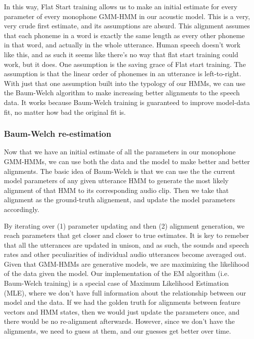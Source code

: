 \documentclass[10pt,a4paper]{article}
\begin{document}
  

In this way, Flat Start training allows us to make an initial estimate for every parameter of every monophone GMM-HMM in our acoustic model. This is a very, very crude first estimate, and its assumptions are absurd. This alignment assumes that each phoneme in a word is exactly the same length as every other phoneme in that word, and actually in the whole utterance. Human speech doesn't work like this, and as such it seems like there's no way that flat start training could work, but it does. One assumption is the saving grace of Flat start training. The assumption is that the linear order of phonemes in an utterance is left-to-right. With just that one assumption built into the typology of our HMMs, we can use the Baum-Welch algorithm to make increasing better alignments to the speech data. It works because Baum-Welch training is guaranteed to improve model-data fit, no matter how bad the original fit is.

\subsubsection*{Baum-Welch re-estimation}

Now that we have an initial estimate of all the parameters in our monophone GMM-HMMs, we can use both the data and the model to make better and better alignments. The basic idea of Baum-Welch is that we can use the the current model parameters of any given utterance HMM to generate the most likely alignment of that HMM to its corresponding audio clip. Then we take that alignment as the ground-truth alignement, and update the model parameters accordingly.

By iterating over (1) parameter updating and then (2) alignment generation, we reach parameters that get closer and closer to true estimates. It is key to remeber that all the utterances are updated in unison, and as such, the sounds and speech rates and other peculiarities of individual audio utterances become averaged out. Given that GMM-HMMs are generative models, we are maximizing the likelihood of the data given the model. Our implementation of the EM algorithm (i.e. Baum-Welch training) is a special case of Maximum Likelihood Estimation (MLE), where we don't have full information about the relationship between our model and the data. If we had the golden truth for alignments between feature vectors and HMM states, then we would just update the parameters once, and there would be no re-alignment afterwards. However, since we don't have the alignments, we need to guess at them, and our guesses get better over time.
\end{document}
